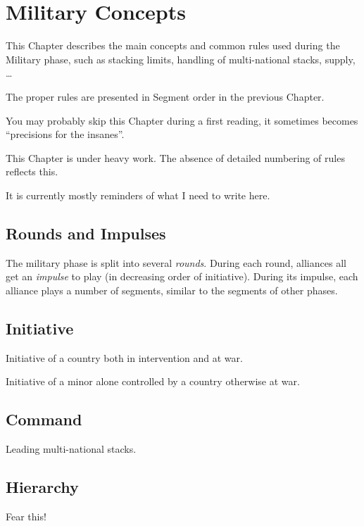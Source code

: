 
\chapter{Military Concepts}\label{chapter:MilitaryConcepts}

\begin{designnote}
  This Chapter describes the main concepts and common rules used
  during the Military phase, such as stacking limits, handling of
  multi-national stacks, supply, \ldots

  The proper rules are presented in Segment order in the previous
  Chapter.

  You may probably skip this Chapter during a first reading, it sometimes
  becomes ``precisions for the insanes''.
\end{designnote}

\begin{todo}
  This Chapter is under heavy work. The absence of detailed numbering of rules
  reflects this.

  It is currently mostly reminders of what I need to write here.
\end{todo}

\section{Rounds and Impulses}
The military phase is split into several \emph{rounds}. During each round,
alliances all get an \emph{impulse} to play (in decreasing order of
initiative). During its impulse, each alliance plays a number of segments,
similar to the segments of other phases.

\section{Initiative}
Initiative of a country both in intervention and at war.

Initiative of a minor alone controlled by a country otherwise at war.

\section{Command}
Leading multi-national stacks.

\section{Hierarchy}
Fear this!

